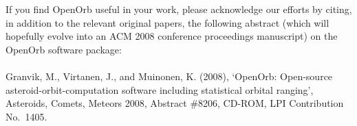 \documentclass[12pt,english,twoside,a4paper]{report}
\begin{document}
If you find OpenOrb useful in your work, please acknowledge our
efforts by citing, in addition to the relevant original papers, the
following abstract (which will hopefully evolve into an ACM 2008
conference proceedings ma\-nu\-script) on the OpenOrb software package: \\ \\ 

\noindent Granvik, M., Virtanen, J., and Muinonen, K. (2008),
`OpenOrb: Open-source asteroid-orbit-computation software including
statistical orbital ranging', Asteroids, Comets, Meteors 2008,
Abstract \#8206, CD-ROM, LPI Contribution No.\ 1405.





\end{document}
